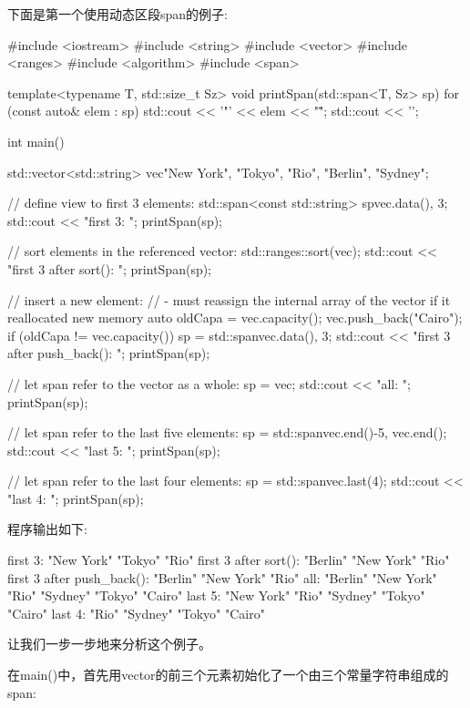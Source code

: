 下面是第一个使用动态区段span的例子:


\begin{cpp}
#include <iostream>
#include <string>
#include <vector>
#include <ranges>
#include <algorithm>
#include <span>

template<typename T, std::size_t Sz>
void printSpan(std::span<T, Sz> sp)
{
	for (const auto& elem : sp) {
		std::cout << '"' << elem << "\" ";
	}
	std::cout << '\n';
}

int main()
{
	std::vector<std::string> vec{"New York", "Tokyo", "Rio", "Berlin", "Sydney"};
	
	// define view to first 3 elements:
	std::span<const std::string> sp{vec.data(), 3};
	std::cout << "first 3: ";
	printSpan(sp);
	
	// sort elements in the referenced vector:
	std::ranges::sort(vec);
	std::cout << "first 3 after sort(): ";
	printSpan(sp);
	
	// insert a new element:
	// - must reassign the internal array of the vector if it reallocated new memory
	auto oldCapa = vec.capacity();
	vec.push_back("Cairo");
	if (oldCapa != vec.capacity()) {
		sp = std::span{vec.data(), 3};
	}
	std::cout << "first 3 after push_back(): ";
	printSpan(sp);

	// let span refer to the vector as a whole:
	sp = vec;
	std::cout << "all: ";
	printSpan(sp);

	// let span refer to the last five elements:
	sp = std::span{vec.end()-5, vec.end()};
	std::cout << "last 5: ";
	printSpan(sp);
	
	// let span refer to the last four elements:
	sp = std::span{vec}.last(4);
	std::cout << "last 4: ";
	printSpan(sp);
}
\end{cpp}

程序输出如下:

\begin{shell}
first 3:              "New York" "Tokyo" "Rio"
first 3 after sort(): "Berlin" "New York" "Rio"
first 3 after push_back(): "Berlin" "New York" "Rio"
all:   "Berlin" "New York" "Rio" "Sydney" "Tokyo" "Cairo"
last 5: "New York" "Rio" "Sydney" "Tokyo" "Cairo"
last 4: "Rio" "Sydney" "Tokyo" "Cairo"
\end{shell}

让我们一步一步地来分析这个例子。


在main()中，首先用vector的前三个元素初始化了一个由三个常量字符串组成的span:

